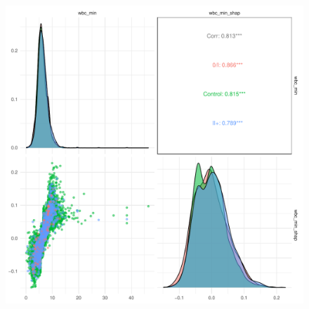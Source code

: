 \documentclass[12pt]{article}
\begin{document}
\begin{figure}[h]
\centering
\includegraphics[width=\textwidth]{figures/diagnosing/wbc_min.pdf}
\end{figure}
\end{document}
